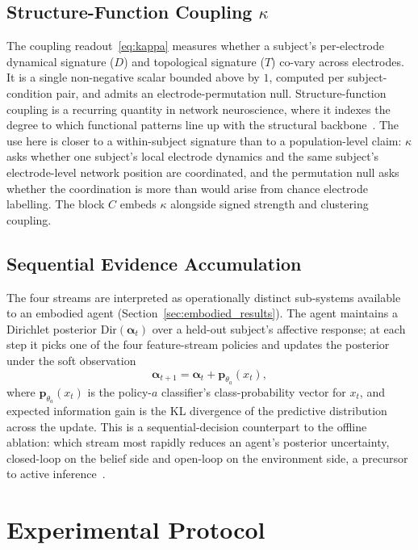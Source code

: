 \documentclass[journal]{IEEEtran}
\begin{document}
\subsection{Structure-Function Coupling $\kappa$}
The coupling readout~\eqref{eq:kappa} measures whether a subject's per-electrode dynamical signature ($D$) and topological signature ($T$) co-vary across electrodes. It is a single non-negative scalar bounded above by $1$, computed per subject-condition pair, and admits an electrode-permutation null. Structure-function coupling is a recurring quantity in network neuroscience, where it indexes the degree to which functional patterns line up with the structural backbone~\cite{honey2009structural,park2013structural,suarez2020linking}. The use here is closer to a within-subject signature than to a population-level claim: $\kappa$ asks whether one subject's local electrode dynamics and the same subject's electrode-level network position are coordinated, and the permutation null asks whether the coordination is more than would arise from chance electrode labelling. The block $C$ embeds $\kappa$ alongside signed strength and clustering coupling.

\subsection{Sequential Evidence Accumulation}
The four streams are interpreted as operationally distinct sub-systems available to an embodied agent (Section~\ref{sec:embodied_results}). The agent maintains a Dirichlet posterior $\mathrm{Dir}(\boldsymbol{\alpha}_t)$ over a held-out subject's affective response; at each step it picks one of the four feature-stream policies and updates the posterior under the soft observation
\begin{equation}
\boldsymbol{\alpha}_{t+1} = \boldsymbol{\alpha}_t + \mathbf{p}_{\theta_a}(x_t),
\label{eq:dirichlet_update}
\end{equation}
where $\mathbf{p}_{\theta_a}(x_t)$ is the policy-$a$ classifier's class-probability vector for $x_t$, and expected information gain is the KL divergence of the predictive distribution across the update. This is a sequential-decision counterpart to the offline ablation: which stream most rapidly reduces an agent's posterior uncertainty, closed-loop on the belief side and open-loop on the environment side, a precursor to active inference~\cite{friston2010free,parr2022activeinference}.

\section{Experimental Protocol}
\end{document}

